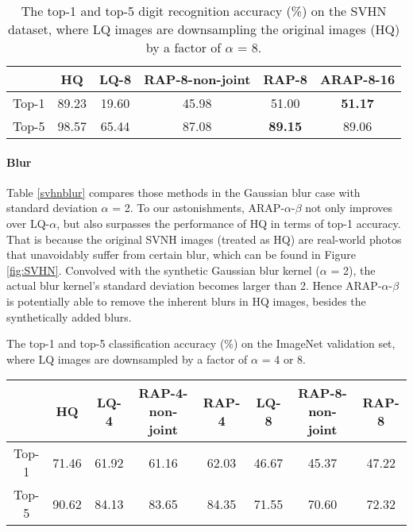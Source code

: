 \documentclass[10pt,twocolumn,twoside]{IEEEtran} %
\begin{document}
\begin{table}
	\fontsize{10pt}{12pt}\selectfont
	\caption{The top-1 and top-5 digit recognition accuracy (\%) on the SVHN dataset, where LQ images are downsampling the original images (HQ) by a factor of $\alpha$ = 8.}	
	\begin{center}
		\begin{tabular}{@{\hskip 1mm}c@{\hskip 1mm}|@{\hskip 1mm}c@{\hskip 1mm}|@{\hskip 1mm}c@{\hskip 1mm}|@{\hskip 1mm}c@{\hskip 1mm}|@{\hskip 1mm}c@{\hskip 1mm}|@{\hskip 1mm}c@{\hskip 1mm}}
			\hline
			& HQ & LQ-8 & RAP-8-non-joint & RAP-8 & ARAP-8-16 \\ \hline
			\hline
			Top-1 & 89.23 & 19.60 & 45.98 & 51.00 & \textbf{51.17} \\ 
			Top-5 & 98.57 & 65.44 & 87.08 & \textbf{89.15} & 89.06 \\ \hline
		\end{tabular}
	\end{center}
	
	\label{svhnlr}
\end{table}\paragraph{Blur}
Table \ref{svhnblur} compares those methods in the Gaussian blur case with standard deviation $\alpha$ = 2. To our astonishments, ARAP-$\alpha$-$\beta$ not only improves over LQ-$\alpha$, but also surpasses the performance of HQ in terms of top-1 accuracy. That is because the original SVNH images (treated as HQ) are real-world photos that unavoidably suffer from certain blur, which can be found in Figure \ref{fig:SVHN}. Convolved with the synthetic Gaussian blur kernel ($\alpha$ = 2), the actual blur kernel's standard deviation becomes larger than 2. 
Hence ARAP-$\alpha$-$\beta$ is potentially able to remove the inherent blurs in HQ images, besides the synthetically added blurs.
	\fontsize{10pt}{12pt}\selectfont
	\caption{The top-1 and top-5 classification accuracy (\%) on the ImageNet validation set, where LQ images are downsampled by a factor of $\alpha$ = 4 or 8.}
	\begin{center}
		\begin{tabular}{c|c|c|c|c|c|c|c}
			\hline
			& HQ & LQ-4 & RAP-4-non-joint & RAP-4 & LQ-8 & RAP-8-non-joint & RAP-8  \\ 
			\hline
			\hline
			Top-1  & 71.46 & 61.92 & 61.16 & 62.03 & 46.67 & 45.37 & 47.22  \\
			Top-5  & 90.62 & 84.13 & 83.65 & 84.35 & 71.55 & 70.60 & 72.32  \\ 
			\hline
		\end{tabular}
	\end{center}
	
\end{document}
